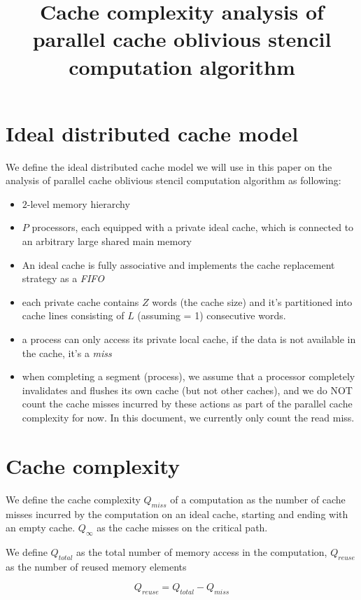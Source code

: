 \documentclass[10pt]{article}
\begin{document}
\title{Cache complexity analysis of parallel cache oblivious stencil computation algorithm}
\maketitle

\section*{Ideal distributed cache model}
We define the ideal distributed cache model we will use in this paper on the analysis of parallel cache oblivious stencil computation algorithm as following:
\begin{itemize}
	\item $2$-level memory hierarchy
	\item $P$ processors, each equipped with a private ideal cache, which is connected to an arbitrary large shared main memory
	\item An ideal cache is fully associative and implements the cache replacement strategy as a \emph{FIFO}
	\item each private cache contains $Z$ words (the cache size) and it's partitioned into cache lines consisting of $L$ (assuming = 1) consecutive words.
	\item a process can only access its private local cache, if the data is not available in the cache, it's a \emph{miss}
	\item when completing a segment (process), we assume that a processor completely invalidates and flushes its own cache (but not other caches), and we do NOT count the cache misses incurred by these actions as part of the parallel cache complexity for now. In this document, we currently only count the read miss.
\end{itemize}

\section{Cache complexity}
We define the cache complexity $Q_{miss}$ of a computation as the number of cache misses incurred by the computation on an ideal cache, starting and ending with an empty cache. $Q_{\infty}$ as the cache misses on the critical path.

We define $Q_{total}$ as the total number of memory access in the computation, $Q_{reuse}$ as the number of reused memory elements

\begin{equation}
Q_{reuse} = Q_{total} - Q_{miss}
\end{equation}
\end{document}
